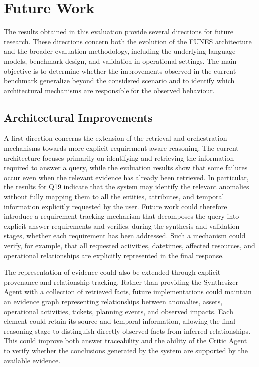 \chapter{Future Work}
\label{sec:future work}

The results obtained in this evaluation provide several directions for future research. These directions concern both the evolution of the FUNES architecture and the broader evaluation methodology, including the underlying language models, benchmark design, and validation in operational settings. The main objective is to determine whether the improvements observed in the current benchmark generalize beyond the considered scenario and to identify which architectural mechanisms are responsible for the observed behaviour.

\section{Architectural Improvements}

A first direction concerns the extension of the retrieval and orchestration mechanisms towards more explicit requirement-aware reasoning. The current architecture focuses primarily on identifying and retrieving the information required to answer a query, while the evaluation results show that some failures occur even when the relevant evidence has already been retrieved. In particular, the results for Q19 indicate that the system may identify the relevant anomalies without fully mapping them to all the entities, attributes, and temporal information explicitly requested by the user. Future work could therefore introduce a requirement-tracking mechanism that decomposes the query into explicit answer requirements and verifies, during the synthesis and validation stages, whether each requirement has been addressed. Such a mechanism could verify, for example, that all requested activities, datetimes, affected resources, and operational relationships are explicitly represented in the final response.

The representation of evidence could also be extended through explicit provenance and relationship tracking. Rather than providing the Synthesizer Agent with a collection of retrieved facts, future implementations could maintain an evidence graph representing relationships between anomalies, assets, operational activities, tickets, planning events, and observed impacts. Each element could retain its source and temporal information, allowing the final reasoning stage to distinguish directly observed facts from inferred relationships. This could improve both answer traceability and the ability of the Critic Agent to verify whether the conclusions generated by the system are supported by the available evidence.


